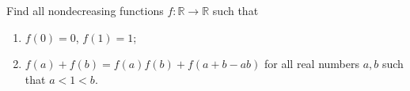 Find all nondecreasing functions $f : \mathbb{R} \to \mathbb{R}$ such that
\begin{enumerate}
\item[(i)] $f(0) = 0$, $f(1) = 1$;
\item[(ii)] $f(a) + f(b) = f(a)f(b) + f(a + b - ab)$ for all real numbers $a, b$ such that $a < 1 < b$.
\end{enumerate}
